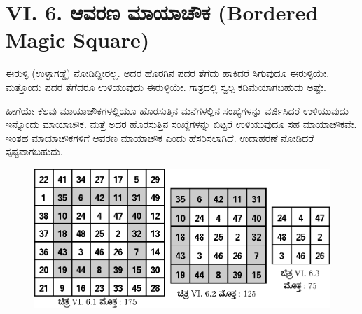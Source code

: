 \section*{VI. 6. ಆವರಣ ಮಾಯಾಚೌಕ (Bordered Magic Square)}

ಈರುಳ್ಳಿ (ಉಳ್ಳಾಗಡ್ಡೆ) ನೋಡಿದ್ದೀರಲ್ಲ. ಅದರ ಹೊರಗಿನ ಪದರ ತೆಗೆದು ಹಾಕಿದರೆ \linebreak ಸಿಗುವುದೂ ಈರುಳ್ಳಿಯೇ. ಮತ್ತೊಂದು ಪದರ ತೆಗೆದರೂ ಉಳಿಯುವುದು ಈರುಳ್ಳಿಯೇ. ಗಾತ್ರದಲ್ಲಿ ಸ್ವಲ್ಪ ಕಡಿಮೆಯಾಗಬಹುದು ಅಷ್ಟೇ.

ಹೀಗೆಯೇ ಕೆಲವು ಮಾಯಾಚೌಕಗಳಲ್ಲಿಯೂ ಹೊರಸುತ್ತಿನ ಮನೆಗಳಲ್ಲಿನ ಸಂಖ್ಯೆಗಳನ್ನು ವರ್ಜಿಸಿದರೆ ಉಳಿಯುವುದು ಇನ್ನೊಂದು ಮಾಯಾಚೌಕ. ಮತ್ತೆ ಅದರ ಹೊರಸುತ್ತಿನ ಸಂಖ್ಯೆ\-ಗಳನ್ನು ಬಿಟ್ಟರೆ ಉಳಿಯುವುದೂ ಸಹ ಮಾಯಾಚೌಕವೇ. ಇಂತಹ ಮಾಯಾಚೌಕಗಳಿಗೆ \linebreak ಆವರಣ ಮಾಯಾಚೌಕ ಎಂದು ಹೆಸರಿಸಲಾಗಿದೆ. ಉದಾಹರಣೆ ನೋಡಿದರೆ ಸ್ಪಷ್ಟವಾಗ\-ಬಹುದು.
\begin{figure}[H]
\includegraphics[scale=.85]{src/figures/chap5/fig5-8.eps}
\end{figure}

